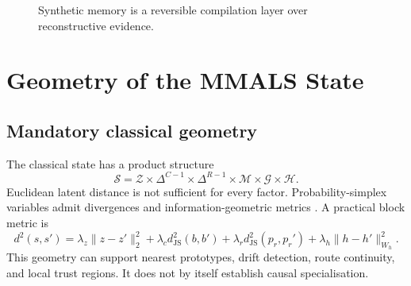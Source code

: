 \documentclass[10pt]{article}
\begin{document}
\begin{figure}[h]
\centering
{}
\caption{Synthetic memory is a reversible compilation layer over reconstructive evidence.}
\label{fig:memory}
\end{figure}

\section{Geometry of the MMALS State}

\subsection{Mandatory classical geometry}

The classical state has a product structure
\begin{equation}
  \mathcal S = \mathcal Z\times\Delta^{C-1}\times\Delta^{R-1}\times\mathcal M\times\mathcal G\times\mathcal H.
  \label{eq:productgeometry}
\end{equation}
Euclidean latent distance is not sufficient for every factor. Probability-simplex variables admit divergences and information-geometric metrics \citep{amari2016information}. A practical block metric is
\begin{equation}
  d^2(s,s')=
  \lambda_z\|z-z'\|_2^2+
  \lambda_c d_{\mathrm{JS}}^2(b,b')+
  \lambda_r d_{\mathrm{JS}}^2(p_r,p_r')+
  \lambda_h\|h-h'\|_{W_h}^2.
  \label{eq:blockmetric}
\end{equation}
This geometry can support nearest prototypes, drift detection, route continuity, and local trust regions. It does not by itself establish causal specialisation.
\end{document}
